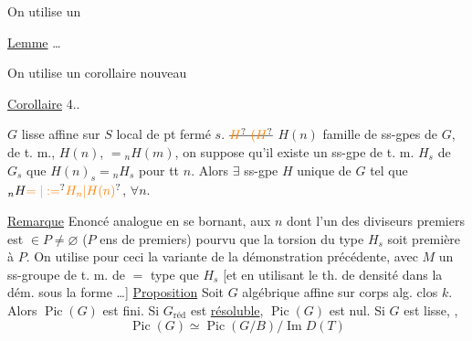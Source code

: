 
On utilise un

\uline{Lemme} \ldots

On utilise un corollaire nouveau 
\margin{\unsure{!!}}

\uline{Corollaire} 4.. 

$G$ lisse affine sur $S$ local de pt fermé $s$. $\deleted{\unsure{H}\ \unsure{(H}}$ $H(n)$ famille de ss-gpes de $G$, de t. m., $H(n)$, $={}_nH(m)$, on suppose qu'il existe un ss-gpe de t. m. $H_s$ de $G_s$  que $H(n)_s={}_nH_s$ pour tt $n$. Alors $\exists$ ss-gpe $H$  unique de $G$ tel que $ {}_nH\unsure{=|\mathrel{:=}} \unsure{H_n|H(n)}$, $\forall n$.

\uline{Remarque}  Enoncé analogue en se bornant, aux $n$ dont l'un des diviseurs premiers est $\in P\ne\varnothing$ ($P$ ens de  premiers) pourvu que la torsion du type $H_s$ soit première à $P$. On utilise pour ceci la variante de la démonstration précédente, avec $M$  un  ss-groupe de t. m. de $=$ type que $H_s$ [et en  utilisant le th. de densité dans la dém. sous la forme \ldots]
\uline{Proposition} Soit $G$  algébrique affine sur corps alg. clos $k$. Alors $\operatorname{Pic}(G)$ est fini. Si $G_{\mathrm{réd}}$ est  \uline{résoluble},  $\operatorname{Pic}(G)$ est nul. Si $G$ est lisse, ,  
\[
\operatorname{Pic}(G)\simeq\operatorname{Pic}(G/B)/\operatorname{Im}D(T)
\]


